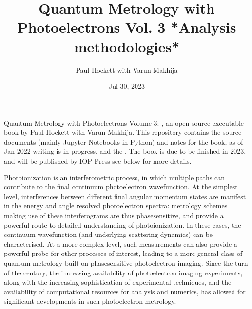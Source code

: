 \documentclass[letterpaper,table,10pt,english]{jupyterBook}
\title{Quantum Metrology with Photoelectrons Vol. 3 *Analysis methodologies*}
\date{Jul 30, 2023}
\author{Paul Hockett with Varun Makhija}
\begin{document}
\pagestyle{empty}
\sphinxmaketitle
\pagestyle{plain}
\sphinxtableofcontents
\pagestyle{normal}
\label{\detokenize{intro::doc}}


\sphinxAtStartPar
Quantum Metrology with Photoelectrons Volume 3: , an open source executable book by Paul Hockett with Varun Makhija. This repository contains the source documents (mainly Jupyter Notebooks in Python) and notes for the book, as of Jan 2022 writing is in progress, and the . The book is due to be finished in 2023, and will be published by IOP Press \sphinxhyphen{} see below for more details.

\begin{DUlineblock}{0em}
\item[] 
\end{DUlineblock}

\sphinxAtStartPar
Photoionization is an interferometric process, in which multiple paths can contribute to the final continuum photoelectron wavefunction. At the simplest level, interferences between different final angular momentum states are manifest in the energy and angle resolved photoelectron spectra: metrology schemes making use of these interferograms are thus phase\sphinxhyphen{}sensitive, and provide a powerful route to detailed understanding of photoionization. In these cases, the continuum wavefunction (and underlying scattering dynamics) can be characterised. At a more complex level, such measurements can also provide a powerful probe for other processes of interest, leading to a more general class of quantum metrology built on phase\sphinxhyphen{}sensitive photoelectron imaging.  Since the turn of the century, the increasing availability of photoelectron imaging experiments, along with the increasing sophistication of experimental techniques, and the availability of computational resources for analysis and numerics, has allowed for significant developments in such photoelectron metrology.

\begin{DUlineblock}{0em}
\item[] 
\end{DUlineblock}
\end{document}
